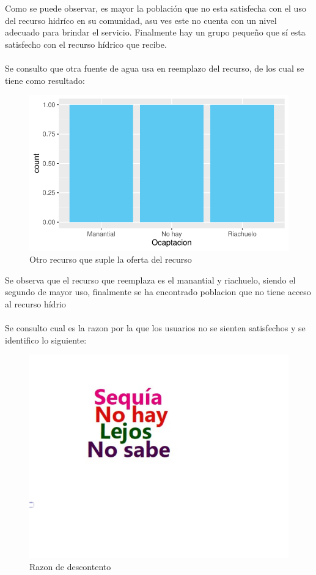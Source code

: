 \documentclass[12pt]{article}\usepackage[]{graphicx}\usepackage[]{xcolor}
\makeatletter
\def\maxwidth{ %
  \ifdim\Gin@nat@width>\linewidth
    \linewidth
  \else
    \Gin@nat@width
  \fi
}
\newenvironment{knitrout}{}{} %
\makeatother
\begin{document}
	Como se puede observar, es mayor la población que no esta satisfecha con el uso del recurso hidríco en su comunidad, asu ves este no cuenta con un nivel adecuado para brindar el servicio. Finalmente hay un grupo pequeño que sí esta satisfecho con el recurso hídrico que recibe.\\
	\\
	Se consulto que otra fuente de agua usa en reemplazo del recurso, de los cual se tiene como resultado:
	\begin{figure}[H]
	\centering
\begin{knitrout}
\color{fgcolor}
\includegraphics[width=\maxwidth]{figure/diecisiete-1} 
\end{knitrout}
	\caption{Otro recurso que suple la oferta del recurso}
	\end{figure}
	Se observa que el recurso que reemplaza es el manantial y riachuelo, siendo el segundo de mayor uso, finalmente se ha encontrado poblacion que no tiene acceso al recurso hídrio\\
	\\
	Se consulto cual es la razon por la que los usuarios no se sienten satisfechos y se identifico lo siguiente:
	\begin{figure}[H]
	\centering
\begin{knitrout}
\color{fgcolor}
\includegraphics[width=\maxwidth]{figure/dieciocho-1} 
\end{knitrout}
	\caption{Razon de descontento}
	\end{figure}
\end{document}
